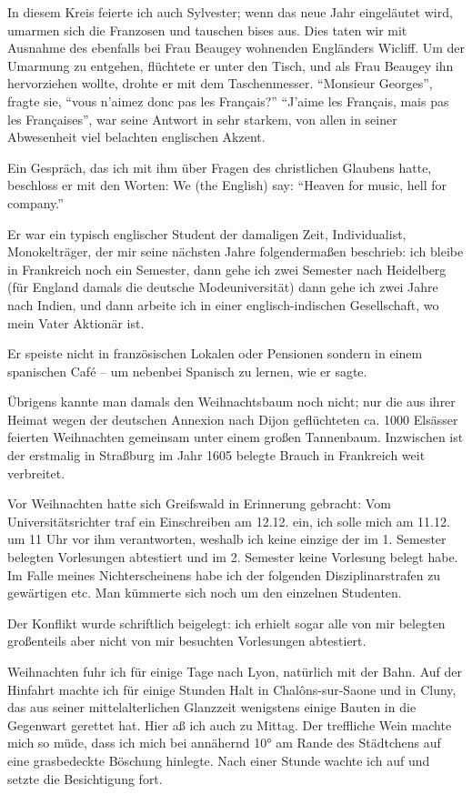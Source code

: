 \documentclass[a5paper,pagesize,10pt,twoside=true]{scrbook}
\begin{document}
In diesem Kreis feierte ich auch Sylvester; wenn das neue Jahr eingeläutet wird, umarmen sich die Franzosen und tauschen bises aus. Dies taten wir mit Ausnahme des ebenfalls bei Frau Beaugey wohnenden Engländers Wicliff. Um der Umarmung zu entgehen, flüchtete er unter den Tisch, und als Frau Beaugey ihn hervorziehen wollte, drohte er mit dem Taschenmesser. \enquote{Monsieur Georges}, fragte sie, \enquote{vous n'aimez donc pas les Français?} \enquote{J'aime les Français, mais pas les Françaises}, war seine Antwort in sehr starkem, von allen in seiner Abwesenheit viel belachten englischen Akzent.

Ein Gespräch, das ich mit ihm über Fragen des christlichen Glaubens hatte, beschloss er mit den Worten: We (the English) say: \enquote{Heaven for music, hell for company.}

Er war ein typisch englischer Student der damaligen Zeit, Individualist, Monokelträger, der mir seine nächsten Jahre folgendermaßen beschrieb: ich bleibe in Frankreich noch ein Semester, dann gehe ich zwei Semester nach Heidelberg (für England damals die deutsche Modeuniversität) dann gehe ich zwei Jahre nach Indien, und dann arbeite ich in einer englisch-indischen Gesellschaft, wo mein Vater Aktionär ist.

Er speiste nicht in französischen Lokalen oder Pensionen sondern in einem spanischen Café -- um nebenbei Spanisch zu lernen, wie er sagte.

Übrigens kannte man damals den Weihnachtsbaum noch nicht; nur die aus ihrer Heimat wegen der deutschen Annexion nach Dijon geflüchteten ca. \num{1000} Elsässer feierten Weihnachten gemeinsam unter einem großen Tannenbaum. Inzwischen ist der erstmalig in Straßburg im Jahr 1605 belegte Brauch in Frankreich weit verbreitet.

Vor Weihnachten hatte sich Greifswald in Erinnerung gebracht: Vom Universitätsrichter traf ein Einschreiben am 12.12. ein, ich solle mich am 11.12. um 11 Uhr vor ihm verantworten, weshalb ich keine einzige der im 1. Semester belegten Vorlesungen abtestiert und im 2. Semester keine Vorlesung belegt habe. Im Falle meines Nichterscheinens habe ich der folgenden Disziplinarstrafen zu gewärtigen etc. Man kümmerte sich noch um den einzelnen Studenten.

Der Konflikt wurde schriftlich beigelegt: ich erhielt sogar alle von mir belegten großenteils aber nicht von mir besuchten Vorlesungen abtestiert.

Weihnachten fuhr ich für einige Tage nach Lyon, natürlich mit der Bahn. Auf der Hinfahrt machte ich für einige Stunden Halt in Chalôns-sur-Saone und in Cluny, das aus seiner mittelalterlichen Glanzzeit wenigstens einige Bauten in die Gegenwart gerettet hat. Hier aß ich auch zu Mittag. Der treffliche Wein machte mich so müde, dass ich mich bei annähernd 10° am Rande des Städtchens auf eine grasbedeckte Böschung hinlegte. Nach einer Stunde wachte ich auf und setzte die Besichtigung fort.
\end{document}
